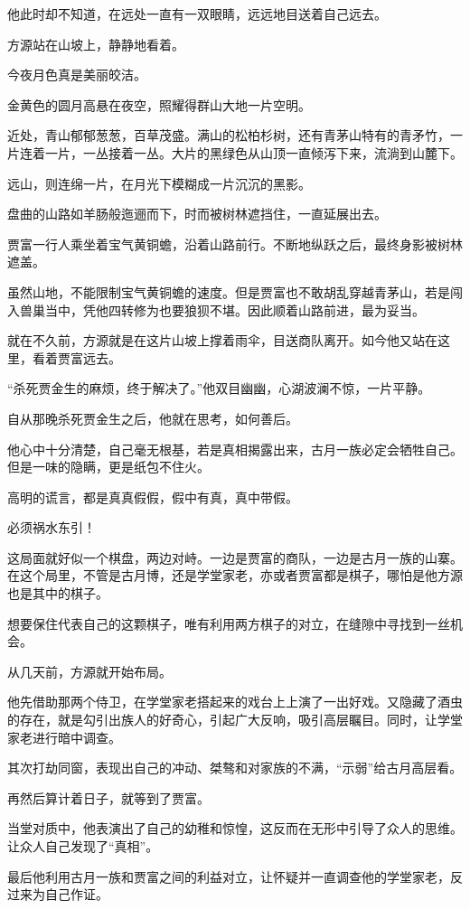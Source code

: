 \begin{this_body}
他此时却不知道，在远处一直有一双眼睛，远远地目送着自己远去。

方源站在山坡上，静静地看着。

今夜月色真是美丽皎洁。

金黄色的圆月高悬在夜空，照耀得群山大地一片空明。

近处，青山郁郁葱葱，百草茂盛。满山的松柏杉树，还有青茅山特有的青矛竹，一片连着一片，一丛接着一丛。大片的黑绿色从山顶一直倾泻下来，流淌到山麓下。

远山，则连绵一片，在月光下模糊成一片沉沉的黑影。

盘曲的山路如羊肠般迤逦而下，时而被树林遮挡住，一直延展出去。

贾富一行人乘坐着宝气黄铜蟾，沿着山路前行。不断地纵跃之后，最终身影被树林遮盖。

虽然山地，不能限制宝气黄铜蟾的速度。但是贾富也不敢胡乱穿越青茅山，若是闯入兽巢当中，凭他四转修为也要狼狈不堪。因此顺着山路前进，最为妥当。

就在不久前，方源就是在这片山坡上撑着雨伞，目送商队离开。如今他又站在这里，看着贾富远去。

“杀死贾金生的麻烦，终于解决了。”他双目幽幽，心湖波澜不惊，一片平静。

自从那晚杀死贾金生之后，他就在思考，如何善后。

他心中十分清楚，自己毫无根基，若是真相揭露出来，古月一族必定会牺牲自己。但是一味的隐瞒，更是纸包不住火。

高明的谎言，都是真真假假，假中有真，真中带假。

必须祸水东引！

这局面就好似一个棋盘，两边对峙。一边是贾富的商队，一边是古月一族的山寨。在这个局里，不管是古月博，还是学堂家老，亦或者贾富都是棋子，哪怕是他方源也是其中的棋子。

想要保住代表自己的这颗棋子，唯有利用两方棋子的对立，在缝隙中寻找到一丝机会。

从几天前，方源就开始布局。

他先借助那两个侍卫，在学堂家老搭起来的戏台上上演了一出好戏。又隐藏了酒虫的存在，就是勾引出族人的好奇心，引起广大反响，吸引高层瞩目。同时，让学堂家老进行暗中调查。

其次打劫同窗，表现出自己的冲动、桀骜和对家族的不满，“示弱”给古月高层看。

再然后算计着日子，就等到了贾富。

当堂对质中，他表演出了自己的幼稚和惊惶，这反而在无形中引导了众人的思维。让众人自己发现了“真相”。

最后他利用古月一族和贾富之间的利益对立，让怀疑并一直调查他的学堂家老，反过来为自己作证。


\end{this_body}
